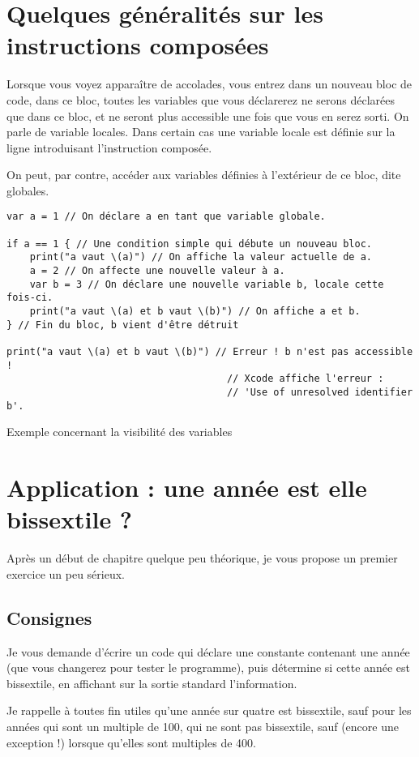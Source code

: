 \section{Quelques généralités sur les instructions composées}
Lorsque vous voyez apparaître de accolades, vous entrez dans un nouveau bloc de code, dans ce bloc, toutes les variables que vous déclarerez ne serons déclarées que dans ce bloc, et ne seront plus accessible une fois que vous en serez sorti. On parle de variable locales. Dans certain cas une variable locale est définie sur la ligne introduisant l'instruction composée.

On peut, par contre, accéder aux variables définies à l'extérieur de ce bloc, dite globales.

\begin{listing}[h]
\begin{verbatim}
var a = 1 // On déclare a en tant que variable globale.
	
if a == 1 { // Une condition simple qui débute un nouveau bloc.
    print("a vaut \(a)") // On affiche la valeur actuelle de a.
    a = 2 // On affecte une nouvelle valeur à a.
    var b = 3 // On déclare une nouvelle variable b, locale cette fois-ci.
    print("a vaut \(a) et b vaut \(b)") // On affiche a et b.
} // Fin du bloc, b vient d'être détruit

print("a vaut \(a) et b vaut \(b)") // Erreur ! b n'est pas accessible !
                                      // Xcode affiche l'erreur :
                                      // 'Use of unresolved identifier b'.
\end{verbatim}%
\caption{Exemple concernant la visibilité des variables}
\end{listing}

\section{Application : une année est elle bissextile ?}
Après un début de chapitre quelque peu théorique, je vous propose un premier exercice un peu sérieux.
\subsection{Consignes}
Je vous demande d'écrire un code qui déclare une constante contenant une année
(que vous changerez pour tester le programme),
puis détermine si cette année est bissextile,
en affichant sur la sortie standard l'information.

Je rappelle à toutes fin utiles qu'une année sur quatre est bissextile,
sauf pour les années qui sont un multiple de 100, qui ne sont pas bissextile,
sauf (encore une exception !) lorsque qu'elles sont multiples de 400.
